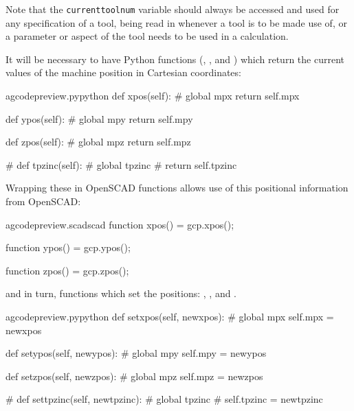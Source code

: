 \documentclass{ltxdoc}
\begin{document}
\noindent Note that the \verb|currenttoolnum| variable should always be accessed and used for any specification of a tool, being read in whenever a tool is to be made use of, or a parameter or aspect of the tool needs to be used in a calculation. %

It will be necessary to have Python functions (, , and ) which return the current values of the machine position in Cartesian coordinates: 

\lstset{firstnumber=\thegcpy}
\begin{writecode}{a}{gcodepreview.py}{python}
    def xpos(self):
#        global mpx
        return self.mpx

    def ypos(self):
#        global mpy
        return self.mpy

    def zpos(self):
#        global mpz
        return self.mpz

#    def tpzinc(self):
#        global tpzinc
#        return self.tpzinc

\end{writecode}
\addtocounter{gcpy}{16}

Wrapping these in OpenSCAD functions allows use of this positional information from OpenSCAD:

\lstset{firstnumber=\thegcpscad}
\begin{writecode}{a}{gcodepreview.scad}{scad}
function xpos() = gcp.xpos();

function ypos() = gcp.ypos();

function zpos() = gcp.zpos();

\end{writecode}
\addtocounter{gcpscad}{9}

\noindent and in turn, functions which set the positions: 
,
, and
.%

\lstset{firstnumber=\thegcpy}
\begin{writecode}{a}{gcodepreview.py}{python}
    def setxpos(self, newxpos):
#        global mpx
        self.mpx = newxpos

    def setypos(self, newypos):
#        global mpy
        self.mpy = newypos

    def setzpos(self, newzpos):
#        global mpz
        self.mpz = newzpos
     
#    def settpzinc(self, newtpzinc):
#        global tpzinc
#        self.tpzinc = newtpzinc

\end{writecode}
\addtocounter{gcpy}{16}
 
\end{document}
